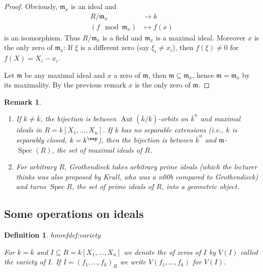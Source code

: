 \documentclass[DIV=14,parskip=full,pointednumbers]{scrartcl}
\newenvironment{alphanumerate}{\begin{enumerate}[label={\upshape(\alph*)}]}{\end{enumerate}}
\theoremstyle{cthm}
\theoremstyle{cvarthm}
\theoremstyle{cdef}
\newtheorem{defi}{Definition}[subsection]
\newtheorem{rem}{Remark}[subsection]
\newcommand{\lbl}[1]{
	\label{#1}
	\edef\dummy{\curthm}
	\expandafter\xdef\csname thmref#1\endcsname{\dummy}
}
\newcommand{\mm}{\mathfrak{m}}
\newcommand{\Aut}{\operatorname{Aut}}
\newcommand{\longto}{\longrightarrow}
\begin{document}
\begin{proof}
 Obviously, $\mm_x$ is an ideal and
 \begin{align*}
  R/\mm_x &\longto k\\
  (f\mod \mm_x) &\longmapsto f(x)
 \end{align*}
is an isomorphism. Thus $R/\mm_x$ is a field and $\mm_x$ is a maximal ideal. Moreover $x$ is the only zero of $\mm_x$: If $\xi$ is a different zero (say $\xi_i\neq x_i$), then $f(\xi)\neq 0$ for $f(X) = X_i-x_i$.

Let $\mm$ be any maximal ideal and $x$ a zero of $\mm$, then $\mm\subseteq\mm_x$, hence $\mm=\mm_x$ by its maximality. By the previous remark $x$ is the only zero of $\mm$.
\end{proof}
\begin{rem}
 \begin{alphanumerate}
  \item If $k\neq\overline{k}$, the bijection is between $\Aut(\overline{k}/k)$-orbits on $\overline{k}^n$ and maximal ideals in $R=k[X_1,\ldots,X_n]$. If $k$ has no separable extensions (i.e., $k$ is \emph{separably closed}, $k=k^{\sep}$), then the bijection is between $\overline{k}^n$ and $\mm$-$\operatorname{Spec}(R)$, the set of maximal ideals of $R$.
  \item For arbitrary $R$, Grothendieck takes arbitrary prime ideals (which the lecturer thinks was also proposed by Krull, who was a \emph{n00b} compared to Grothendieck) and turns $\operatorname{Spec} R$, the set of prime ideals of $R$, into a geometric object.
 \end{alphanumerate}

\end{rem}


\subsection{Some operations on ideals}\label{sec:operationsOnIdeals}
\begin{defi}\lbl{def:variety}
 For $k=\overline{k}$ and $I\subseteq R = k[X_1,\ldots,X_n]$ we denote the of zeros of $I$ by $V(I)$ called the \emph{variety} of $I$. If $I=(f_1,\ldots,f_k)_R$ we write $V(f_1,\ldots,f_k)$ for $V(I)$.
\end{defi}
\end{document}
